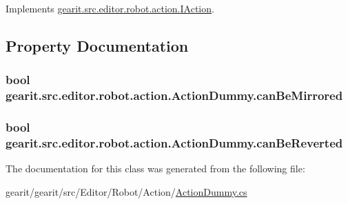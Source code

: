 Implements \hyperlink{interfacegearit_1_1src_1_1editor_1_1robot_1_1action_1_1_i_action_a8a84360c15fcd7d0f60ff7aef2dca980}{gearit.\+src.\+editor.\+robot.\+action.\+I\+Action}.



\subsection{Property Documentation}
\hypertarget{classgearit_1_1src_1_1editor_1_1robot_1_1action_1_1_action_dummy_a9865ea4ec860378a09c5a6c8a50cad45}{
\subsubsection[{can\+Be\+Mirrored}]{\setlength{\rightskip}{0pt plus 5cm}bool gearit.\+src.\+editor.\+robot.\+action.\+Action\+Dummy.\+can\+Be\+Mirrored\hspace{0.3cm}{\ttfamily [get]}}}\label{classgearit_1_1src_1_1editor_1_1robot_1_1action_1_1_action_dummy_a9865ea4ec860378a09c5a6c8a50cad45}
\hypertarget{classgearit_1_1src_1_1editor_1_1robot_1_1action_1_1_action_dummy_a8940705eae76153fee9d9e7ec0a54884}{
\subsubsection[{can\+Be\+Reverted}]{\setlength{\rightskip}{0pt plus 5cm}bool gearit.\+src.\+editor.\+robot.\+action.\+Action\+Dummy.\+can\+Be\+Reverted\hspace{0.3cm}{\ttfamily [get]}}}\label{classgearit_1_1src_1_1editor_1_1robot_1_1action_1_1_action_dummy_a8940705eae76153fee9d9e7ec0a54884}


The documentation for this class was generated from the following file\+:\begin{DoxyCompactItemize}
\item 
gearit/gearit/src/\+Editor/\+Robot/\+Action/\hyperlink{_robot_2_action_2_action_dummy_8cs}{Action\+Dummy.\+cs}\end{DoxyCompactItemize}

